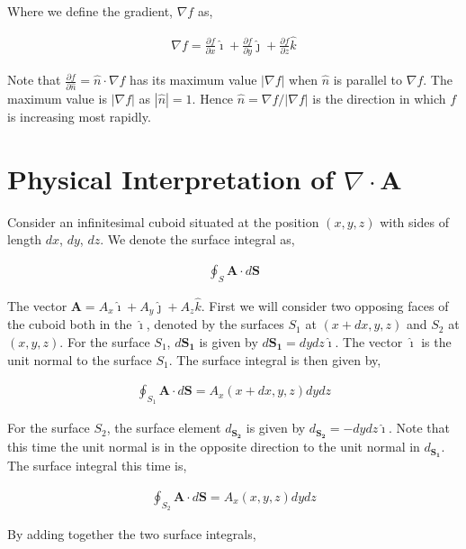 \documentclass[11pt]{amsart}
\begin{document}
Where we define the gradient, $\nabla f$ as,

\begin{align*}
  \nabla f = \frac{\partial f}{\partial x} \hat{\imath} + \frac{\partial f}{\partial y} \hat{\jmath} + \frac{\partial f}{\partial z} \hat{k}
\end{align*}

Note that $\frac{\partial f}{\partial \hat{n}} = \hat{n} \cdot \nabla f$ has its maximum value $|\nabla f|$ when $\hat{n}$ is parallel to $\nabla f$. The maximum value is $|\nabla f|$ as $|\hat{n}| = 1$. Hence $\hat{n} = \nabla f / |\nabla f|$ is the direction in which $f$ is increasing most rapidly.

\section{Physical Interpretation of $\nabla \cdot \mathbf{A}$}

Consider an infinitesimal cuboid situated at the position $(x, y, z)$ with sides of length $dx$, $dy$, $dz$. We denote the surface integral as,

\begin{align*}
  \oint_S \mathbf{A} \cdot d\mathbf{S}
\end{align*}

The vector $\mathbf{A} = A_x \hat{\imath} + A_y \hat{\jmath} + A_z \hat{k}$. First we will consider two opposing faces of the cuboid both in the $\hat{\imath}$, denoted by the surfaces $S_1$ at $(x + dx, y, z)$ and $S_2$ at $(x, y, z)$. For the surface $S_1$, $d\mathbf{S_1}$ is given by $d\mathbf{S_1} = dy dz \hat{\imath}$. The vector $\hat{\imath}$ is the unit normal to the surface $S_1$. The surface integral is then given by,

\begin{align*}
  \oint_{S_1} \mathbf{A} \cdot d\mathbf{S} = A_x(x + dx, y, z) dy dz
\end{align*}

For the surface $S_2$, the surface element $d_\mathbf{S_2}$ is given by $d_\mathbf{S_2} = -dy dz \hat{\imath}$. Note that this time the unit normal is in the opposite direction to the unit normal in $d_\mathbf{S_1}$. The surface integral this time is,

\begin{align*}
  \oint_{S_2} \mathbf{A} \cdot d\mathbf{S} = A_x(x, y, z) dy dz
\end{align*}

By adding together the two surface integrals,
\end{document}
